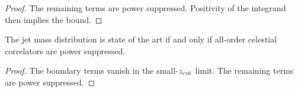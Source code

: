\begin{proof}
The remaining terms are power suppressed. Positivity of the integrand
then implies the bound.
\end{proof}

\begin{theorem}\label{thm:4}
The jet mass distribution is state of the art if and only if all-order
celestial correlators are power suppressed.
\end{theorem}

\begin{proof}
The boundary terms vanish in the small-$z_{\rm cut}$ limit. The
remaining terms are power suppressed.
\end{proof}

